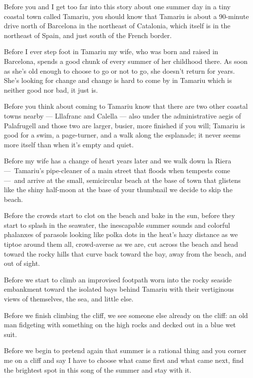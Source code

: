 Before you and I get too far into this story about one summer day in a
tiny coastal town called Tamariu, you should know that Tamariu is about
a 90-minute drive north of Barcelona in the northeast of Catalonia,
which itself is in the northeast of Spain, and just south of the French
border.

Before I ever step foot in Tamariu my wife, who was born and raised in
Barcelona, spends a good chunk of every summer of her childhood there.
As soon as she's old enough to choose to go or not to go, she doesn't
return for years. She's looking for change and change is hard to come by
in Tamariu which is neither good nor bad, it just is.

Before you think about coming to Tamariu know that there are two other
coastal towns nearby --- Lllafranc and Calella --- also under the
administrative aegis of Palafrugell and those two are larger, busier,
more finished if you will; Tamariu is good for a swim, a page-turner,
and a walk along the esplanade; it never seems more itself than when
it's empty and quiet.

Before my wife has a change of heart years later and we walk down la
Riera ---~Tamariu's pipe-cleaner of a main street that floods when
tempests come ---~and arrive at the small, semicircular beach at the
base of town that glistens like the shiny half-moon at the base of your
thumbnail we decide to skip the beach.

Before the crowds start to clot on the beach and bake in the sun, before
they start to splash in the seawater, the inescapable summer sounds and
colorful phalanxes of parasols looking like polka dots in the heat's
hazy distance as we tiptoe around them all, crowd-averse as we are, cut
across the beach and head toward the rocky hills that curve back toward
the bay, away from the beach, and out of sight.

Before we start to climb an improvised footpath worn into the rocky
seaside embankment toward the isolated bays behind Tamariu with their
vertiginous views of themselves, the sea, and little else.

Before we finish climbing the cliff, we see someone else already on the
cliff: an old man fidgeting with something on the high rocks and decked
out in a blue wet suit.

Before we begin to pretend again that summer is a rational thing and you
corner me on a cliff and say I have to choose what came first and what
came next, find the brightest spot in this song of the summer and stay
with it.

